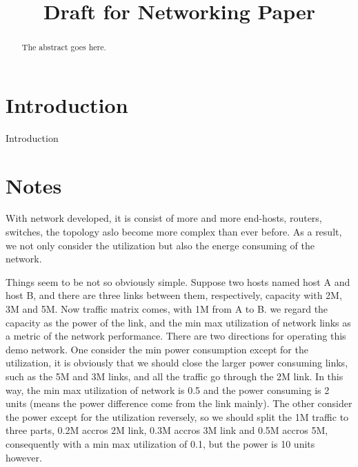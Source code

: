 \documentclass[conference]{IEEEtran}
\begin{document}
\title{Draft for Networking Paper}


\author{
\and
{}
\and
{}
}


\maketitle

\begin{abstract}
The abstract goes here.
\end{abstract}

\IEEEpeerreviewmaketitle

\section{Introduction}
Introduction


\section{Notes}
With network developed, it is consist of more and more end-hosts, routers, switches, the topology aslo become more
complex than ever before. As a result, we not only consider the utilization but also the energe consuming of the network.

Things seem to be not so obviously simple. Suppose two hosts named host A and host B, and there are three links between them,
respectively, capacity with 2M, 3M and 5M. Now traffic matrix comes, with 1M from A to B. we regard the capacity as the power
of the link, and the min max utilization of network links as a metric of the network performance. There are two 
directions for operating this demo network. One consider the min power consumption except for the utilization, 
it is obviously that we should close the larger power consuming links, such as the 5M and 3M links, and all the traffic 
go through the 2M link. In this way, the min max utilization of network is 0.5 and the power consuming is 2 units 
(means the power difference come from the link mainly). The other consider the power except for the utilization reversely,
so we should split the 1M traffic to three parts, 0.2M accros 2M link, 0.3M accros 3M link and 0.5M accros 5M, consequently with 
a min max utilization of 0.1, but the power is 10 units however.
\end{document}
